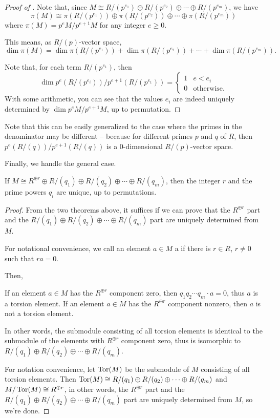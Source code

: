 \begin{proof}[Proof of ]
	Note that, since $M \cong R/(p^{e_1}) \oplus R/(p^{e_2}) \oplus \cdots \oplus R/(p^{e_m})$, we have
	\[ \pi(M) \cong \pi(R/(p^{e_1})) \oplus \pi(R/(p^{e_2})) \oplus \cdots \oplus \pi(R/(p^{e_m})) \]
	where $\pi(M) = p^e M/p^{e+1} M$ for any integer $e \geq 0$.

	This means, as $R/(p)$-vector space,
	\[ \dim \pi(M) = \dim \pi(R/(p^{e_1})) + \dim \pi(R/(p^{e_2})) + \cdots + \dim \pi(R/(p^{e_m})). \]

	Note that, for each term $R/(p^{e_1})$, then
	\[ \dim p^e (R/(p^{e_i})) / p^{e+1} (R/(p^{e_1})) = \begin{cases}
		1 & e < e_i \\
		0 & \text{otherwise}.
	\end{cases} \]
	With some arithmetic, you can see that the values $e_i$ are indeed uniquely determined by $\dim p^e
	M/p^{e+1} M$, up to permutation.
\end{proof}

Note that this can be easily generalized to the case where the primes in the denominator may be different
-- because for different primes $p$ and $q$ of $R$, then $p^e (R/(q))/p^{e+1} (R/(q))$ is a
$0$-dimensional $R/(p)$-vector space.

Finally, we handle the general case.
\begin{theorem}
	If $M \cong R^{\oplus r} \oplus R/(q_1) \oplus R/(q_2) \oplus \cdots \oplus R/(q_m)$,
	then the integer $r$ and the prime powers $q_i$ are unique, up to permutations.
\end{theorem}
\begin{proof}
	From the two theorems above, it suffices if we can prove that the $R^{\oplus r}$ part and the
	$R/(q_1) \oplus R/(q_2) \oplus \cdots \oplus R/(q_m)$ part are uniquely determined from $M$.

	For notational convenience, we call an element $a \in M$ a  if there is $r \in
	R$, $r \neq 0$ such that $r a = 0$.

	Then,
	\begin{itemize}
		\ii If an element $a \in M$ has the $R^{\oplus r}$ component zero, then $q_1 q_2 \cdots q_m \cdot
		a = 0$, thus $a$ is a torsion element.
		\ii If an element $a \in M$ has the $R^{\oplus r}$ component nonzero, then $a$ is not a torsion
		element.
	\end{itemize}

	In other words, the submodule consisting of all torsion elements is identical to the submodule of the
	elements with $R^{\oplus r}$ component zero, thus is isomorphic to
	$R/(q_1) \oplus R/(q_2) \oplus \cdots \oplus R/(q_m)$.

	For notation convenience, let $\operatorname{Tor}(M)$ be the submodule of $M$ consisting of all torsion elements.
	Then $\operatorname{Tor}(M) \cong R/(q_1) \oplus R/(q_2) \oplus \cdots \oplus R/(q_m)$ and $M/\operatorname{Tor}(M) \cong
	R^{\oplus r}$, in other words, the $R^{\oplus r}$ part and the
	$R/(q_1) \oplus R/(q_2) \oplus \cdots \oplus R/(q_m)$ part are uniquely determined from $M$, so we're
	done.
\end{proof}


